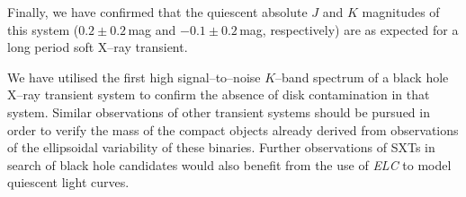 \vspace{\myparskip}

Finally, we have confirmed that the quiescent absolute $J$ and $K$
magnitudes of this system ($0.2\pm0.2$\,mag and $-0.1\pm0.2$\,mag,
respectively) are as expected for a long period soft X--ray
transient. %

\vspace{\myparskip}

We have utilised the first high signal--to--noise $K$--band spectrum of a
black hole X--ray transient system to confirm the absence of disk
contamination in that system. Similar observations of other transient
systems should be pursued in order to verify the mass of the compact
objects already derived from observations of the ellipsoidal
variability of these binaries. Further observations of SXTs in search of black hole candidates would also benefit from the use of \textit{ELC} to model quiescent light curves. %

